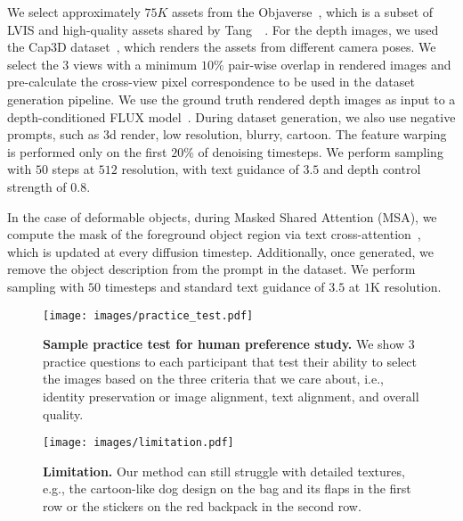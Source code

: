  We select approximately $75K$ assets from the Objaverse~\cite{deitke2023objaverse}, which is a subset of LVIS and high-quality assets shared by Tang~\etal~\cite{tang2025lgm}. For the depth images, we used the Cap3D dataset~\cite{luo2024scalable}, which renders the assets from different camera poses. We select the $3$ views with a minimum $10\%$ pair-wise overlap in rendered images and pre-calculate the cross-view pixel correspondence to be used in the dataset generation pipeline. We use the ground truth rendered depth images as input to a depth-conditioned FLUX model~\cite{xflux}. During dataset generation, we also use negative prompts, such as {\menlo 3d render, low resolution, blurry, cartoon}. The feature warping is performed only on the first $20\%$ of denoising timesteps. We perform sampling with $50$ steps at $512$ resolution, with text guidance of $3.5$ and depth control strength of $0.8$.  

In the case of deformable objects, during Masked Shared Attention (MSA), we compute the mask of the foreground object region via text cross-attention~\cite{hertz2022prompt}, which is updated at every diffusion timestep. Additionally, once generated, we remove the object description from the prompt in the dataset. We perform sampling with $50$ timesteps and standard text guidance of $3.5$ at $1$K resolution. 



\begin{figure*}[!t]
    \centering
    \texttt{[image: images/practice\_test.pdf]}
    \vspace{-20pt}
    \caption{{\textbf{Sample practice test for human preference study.} We show $3$ practice questions to each participant that test their ability to select the images based on the three criteria that we care about, i.e., identity preservation or image alignment, text alignment, and overall quality. 
    }}
    \vspace{-10pt}
\end{figure*}


\begin{figure}[!t]
    \centering
    \texttt{[image: images/limitation.pdf]}
    \vspace{-10pt}
    \caption{{\textbf{Limitation.} Our method can still struggle with detailed textures, e.g., the cartoon-like dog design on the bag and its flaps in the first row or the stickers on the red backpack in the second row. 
    }}
    \vspace{-10pt}
\end{figure}

